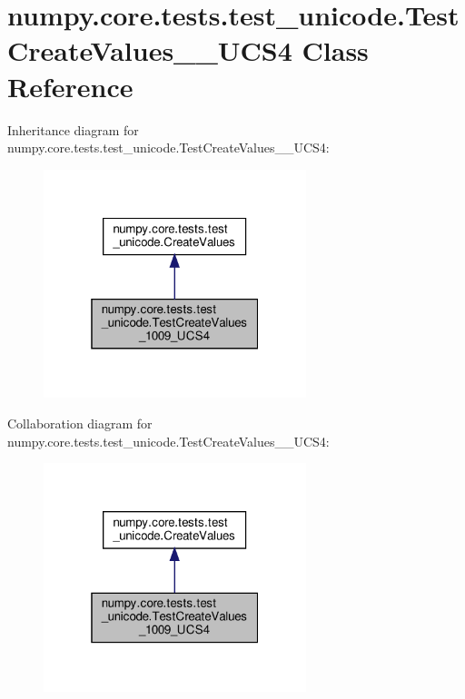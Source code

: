 \hypertarget{classnumpy_1_1core_1_1tests_1_1test__unicode_1_1TestCreateValues__1009__UCS4}{}\section{numpy.\+core.\+tests.\+test\+\_\+unicode.\+Test\+Create\+Values\+\_\+\_\+\+U\+C\+S4 Class Reference}
\label{classnumpy_1_1core_1_1tests_1_1test__unicode_1_1TestCreateValues__1009__UCS4}


Inheritance diagram for numpy.\+core.\+tests.\+test\+\_\+unicode.\+Test\+Create\+Values\+\_\+\_\+\+U\+C\+S4\+:
\nopagebreak
\begin{figure}[H]
\begin{center}
\leavevmode
\includegraphics[width=217pt]{classnumpy_1_1core_1_1tests_1_1test__unicode_1_1TestCreateValues__1009__UCS4__inherit__graph}
\end{center}
\end{figure}


Collaboration diagram for numpy.\+core.\+tests.\+test\+\_\+unicode.\+Test\+Create\+Values\+\_\+\_\+\+U\+C\+S4\+:
\nopagebreak
\begin{figure}[H]
\begin{center}
\leavevmode
\includegraphics[width=217pt]{classnumpy_1_1core_1_1tests_1_1test__unicode_1_1TestCreateValues__1009__UCS4__coll__graph}
\end{center}
\end{figure}
